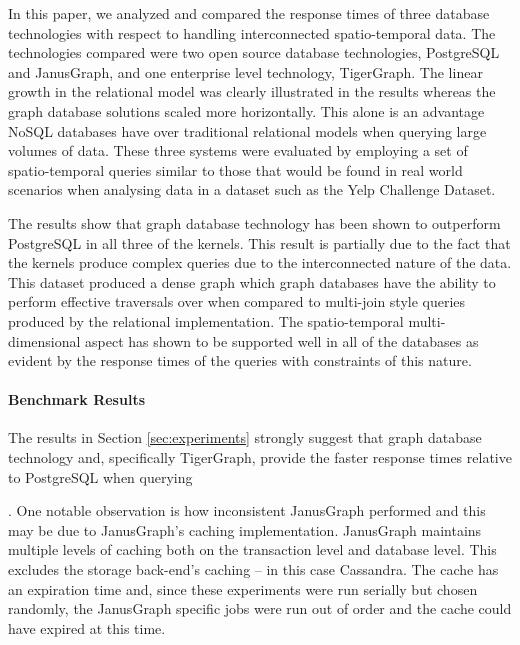 In this paper, we analyzed and compared the response times of three database technologies with respect to handling interconnected spatio-temporal data. The technologies compared were two open source database technologies, PostgreSQL and JanusGraph, and one enterprise level technology, TigerGraph. The linear growth in the relational model was clearly illustrated in the results whereas the graph database solutions scaled more horizontally. This alone is an advantage NoSQL databases have over traditional relational models when querying large volumes of data. These three systems were evaluated by employing a set of spatio-temporal queries similar to those that would be found in real world scenarios when analysing data in a dataset such as the Yelp Challenge Dataset. 

The results show that graph database technology has been shown to outperform PostgreSQL in all three of the kernels. This result is partially due to the fact that the kernels produce complex queries due to the interconnected nature of the data. This dataset produced a dense graph which graph databases have the ability to perform effective traversals over when compared to multi-join style queries produced by the relational implementation. The spatio-temporal multi-dimensional aspect has shown to be supported well in all of the databases as evident by the response times of the queries with constraints of this nature.

\paragraph{Benchmark Results}

The results in Section \ref{sec:experiments} strongly suggest that graph database technology and, specifically TigerGraph, provide the faster response times relative to PostgreSQL when querying  

. One notable observation is how inconsistent JanusGraph performed and this may be due to JanusGraph's caching implementation. JanusGraph maintains multiple levels of caching both on the transaction level and database level. This excludes the storage back-end's caching -- in this case Cassandra. The cache has an expiration time and, since these experiments were run serially but chosen randomly, the JanusGraph specific jobs were run out of order and the cache could have expired at this time.

